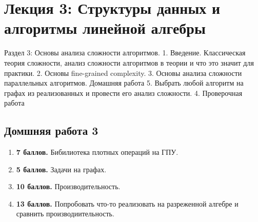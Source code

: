 \section{Лекция 3: Структуры данных и алгоритмы линейной алгебры}

Раздел 3: Основы анализа сложности алгоритмов.
    1. Введение. Классическая теория сложности, анализ сложности алгоритмов в теории и что это значит для практики. 
    2. Основы fine-grained complexity.
    3. Основы анализа сложности параллельных алгоритмов.
		Домашняя работа 5. Выбрать любой алгоритм на графах из реализованных и провести его анализ сложности.
    4. Проверочная работа


\subsection{Домшняя работа 3}

\begin{enumerate}
   \item \textbf{7 баллов.} Бибилиотека плотных операций на ГПУ.
   \item \textbf{5 баллов.} Задачи на графах.
   \item \textbf{10 баллов.} Производительность.
   \item \textbf{13 баллов.} Попробовать что-то реализовать на разреженной алгебре и сравнить производиительность.
\end{enumerate}
